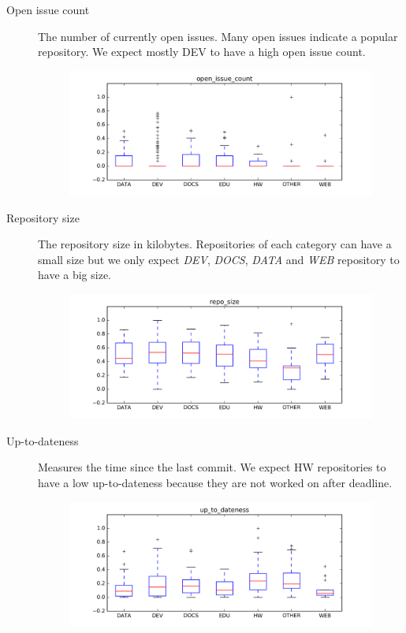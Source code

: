 \documentclass[a4paper]{scrartcl}
\begin{document}
\begin{description}
\begin{figure}[h!]
				\end{figure}
			\item[Open issue count]
				The number of currently open issues. Many open issues indicate a popular repository. We expect mostly DEV to have a high open issue count.
				\begin{figure}[h!]
					\centering
					\includegraphics[width=0.75\linewidth]{figures/open_issue_count.png}
				\end{figure}
			\item[Repository size]
				The repository size in kilobytes. Repositories of each category can have a small size but we only expect \emph{DEV}, \emph{DOCS}, \emph{DATA} and \emph{WEB} repository to have a big size.
				\begin{figure}[h!]
					\centering
					\includegraphics[width=0.75\linewidth]{figures/repo_size.png}
				\end{figure}
			\item[Up-to-dateness]
				Measures the time since the last commit. We expect HW repositories to have a low up-to-dateness because they are not worked on after deadline.
				\begin{figure}[h!]
					\centering
					\includegraphics[width=0.75\linewidth]{figures/up_to_dateness.png}
				\end{figure}

\end{description}
\end{document}
